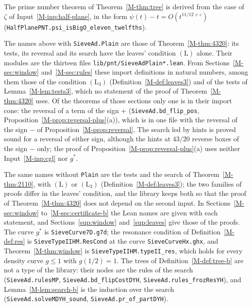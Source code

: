 \documentclass[11pt]{article}
\newcommand{\lean}[1]{\texttt{#1}}
\newcommand{\file}[1]{\nolinkurl{#1}}
\numberwithin{equation}{section}
\begin{document}
\begin{sloppypar}
The prime number theorem of Theorem~\ref{M-thm:tree} is derived from the case of $\zeta$ of
Input~\ref{M-inp:half-plane},
in the form $\psi(t) - t = O(t^{11/12 + \varepsilon})$ (\lean{HalfPlanePNT.\allowbreak psi\_isBigO\_eleven\_twelfths}).

The names above with \lean{SieveAd.Plain} are those of Theorem~\ref{M-thm:4320}: its tests, its reversal and its search
have the leaves' condition $(\mathrm L)$ alone. Their modules are the thirteen files \file{lib/pnt/SieveAdPlain*.lean}.
From Sections~\ref{M-sec:window} and~\ref{M-sec:rules} these import definitions in natural numbers, among them those of
the condition $(\mathrm L_3)$ (Definition~\ref{M-def:leaves3}) and of the tests of Lemma~\ref{M-lem:tests3}, which no
statement of the proof of Theorem~\ref{M-thm:4320} uses. Of the theorems of those sections only one is in their import
cone: the reversal of a term of the sign $+$ (\lean{SieveAd.bd\_flip\_pos}, Proposition~\ref{M-prop:reversal-plus}(a)),
which is in one file with the reversal of the sign $-$ of Proposition~\ref{M-prop:reversal}. The search led by hints is
proved sound for a reversal of either sign, although the hints at $43/20$ reverse boxes of the sign $-$ only; the proof
of Proposition~\ref{M-prop:reversal-plus}(a) uses neither Input~\ref{M-inp:cgl} nor $g^*$.

The same names without
\lean{Plain} are the tests and the search of Theorem~\ref{M-thm:2110}, with $(\mathrm L)$ or $(\mathrm L_3)$
(Definition~\ref{M-def:leaves3}); the two families of proofs differ in the leaves' condition, and the library keeps
both so that the proof of Theorem~\ref{M-thm:4320} does not depend on the second input. In
Sections~\ref{M-sec:window} to~\ref{M-sec:certificate-b} the Lean names are given with each statement, and
Sections~\ref{sup:window} and~\ref{sup:leaves} give those of the proofs. The curve $g^*$ is \lean{SieveCurve7D.g7d};
the resonance condition of Definition~\ref{M-def:res} is \lean{SieveTypeIIHM.ResCond} at the curve
\lean{SieveCurveHx.ghx}, and Theorem~\ref{M-thm:window} is \lean{SieveTypeIIHM.typeII\_res}, which holds for every
density curve $g \le 1$ with $g(1/2) = 1$. The trees of Definition~\ref{M-def:tree-b} are not a type of the library:
their nodes are the rules of the search (\lean{SieveAd.rulesMP}, \lean{SieveAd.bd\_flipCostDYH},
\lean{SieveAd.rules\_frozResYH}), and Lemma~\ref{M-lem:search-b} is the induction over the search
(\lean{SieveAd.solveMDYH\_sound}, \lean{SieveAd.pr\_of\_partDYH}).
\end{sloppypar}
\end{document}

